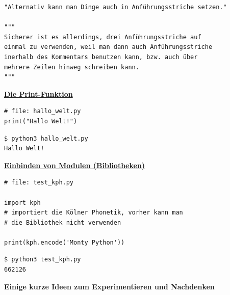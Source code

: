 \begin{verbatim}
"Alternativ kann man Dinge auch in Anführungsstriche setzen."

"""
Sicherer ist es allerdings, drei Anführungsstriche auf
einmal zu verwenden, weil man dann auch Anführungsstriche
inerhalb des Kommentars benutzen kann, bzw. auch über
mehrere Zeilen hinweg schreiben kann.
"""
\end{verbatim}



\vspace{0.5cm}\par\noindent\textbf{\href{code/hallo_welt.py}{Die Print-Funktion}}\vspace{0.5cm}

\begin{verbatim}
# file: hallo_welt.py
print("Hallo Welt!")
\end{verbatim}

\begin{verbatim}
$ python3 hallo_welt.py
Hallo Welt!
\end{verbatim}

\vspace{0.5cm}\par\noindent\textbf{\href{code/test_kph.py}{Einbinden von Modulen (Bibliotheken)}}\vspace{0.5cm}

\begin{verbatim}
# file: test_kph.py

import kph 
# importiert die Kölner Phonetik, vorher kann man
# die Bibliothek nicht verwenden

print(kph.encode('Monty Python'))
\end{verbatim}

\begin{verbatim}
$ python3 test_kph.py
662126
\end{verbatim}



\vspace{0.5cm}\par\noindent\textbf{Einige kurze Ideen zum Experimentieren und Nachdenken}\vspace{0.5cm}

